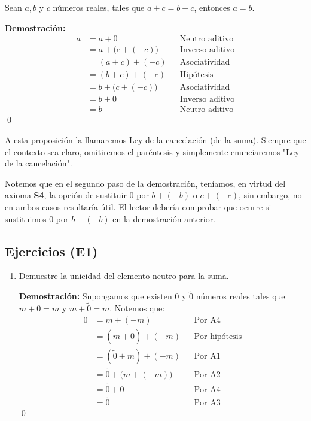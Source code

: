 \documentclass[11pt]{article}
\begin{document}
\pagebreak

Sean $a,b$ y $c$ números reales, tales que $a+c=b+c$, entonces $a=b$.

\textbf{Demostración:} \begin{align*}
    a &= a+0 && \text{Neutro aditivo}\\
    &= a+ \bigl(c+(-c)\bigr) && \text{Inverso aditivo}\\
    &= (a+c) + (-c) && \text{Asociatividad}\\
    &= (b+c) + (-c) && \text{Hipótesis}\\
    &= b + \bigl(c+(-c)\bigr) && \text{Asociatividad}\\
    &= b + 0 && \text{Inverso aditivo}\\
    &= b && \text{Neutro aditivo}
\end{align*}\qed

A esta proposición la llamaremos Ley de la cancelación (de la suma). Siempre que el contexto sea claro, omitiremos el paréntesis y simplemente enunciaremos "Ley de la cancelación".

Notemos que en el segundo paso de la demostración, teníamos, en virtud del axioma \textbf{S4}, la opción de sustituir $0$ por $b+(-b)$ o $c+(-c)$, sin embargo, no en ambos casos resultaría útil. El lector debería comprobar que ocurre si sustituimos $0$ por $b+(-b)$ en la demostración anterior.

\subsection*{Ejercicios (E1)}

\begin{enumerate}[label=(\alph*)]
    \item Demuestre la unicidad del elemento neutro para la suma.
    
\textbf{Demostración:} 
Supongamos que existen 0 y $\tilde{0}$ números reales tales que $m+0 = m$ y $m+\tilde{0} = m$. Notemos que: \begin{align*}
    0 &=m+(-m) && \text{Por A4}\\
    &=\left( m+\tilde{0} \right)+\left(-m\right) && \text{Por hipótesis}\\
    &=\left( \tilde{0}+m \right)+\left(-m\right) && \text{Por A1}\\
    &=\tilde{0} + \bigl( m + \left(-m \right)\bigr) && \text{Por A2}\\
    &=\tilde{0} + 0 && \text{Por A4}\\
    &=\tilde{0} && \text{Por A3}
    \end{align*} \qed

\end{enumerate}
\end{document}
